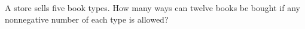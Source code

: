A store sells five book types. How many ways can twelve books be bought if any nonnegative number of each type is allowed?
